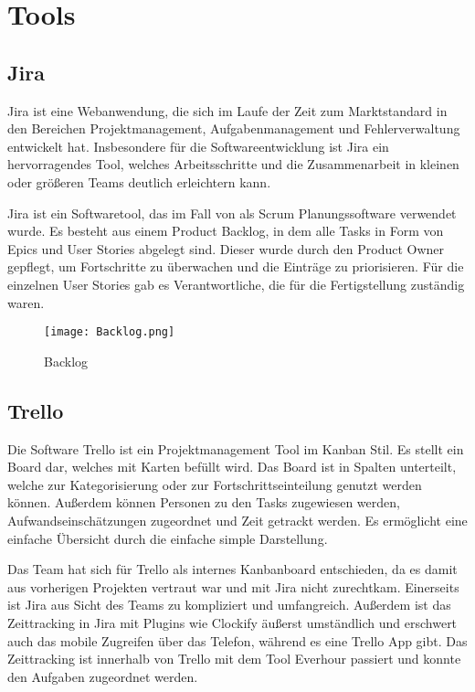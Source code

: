 
%


\section{Tools}\label{sec:tools}

\renewcommand{\kapitelautor}{Autor: Nils Hubmann}

\subsection{Jira}\label{subsec:jira}
%

\begin{coolQuote}
Jira ist eine Webanwendung, die sich im Laufe der Zeit zum Marktstandard in den Bereichen Projektmanagement, Aufgabenmanagement und Fehlerverwaltung entwickelt hat.
Insbesondere für die Softwareentwicklung ist Jira ein hervorragendes Tool, welches Arbeitsschritte und die Zusammenarbeit in kleinen oder größeren Teams deutlich erleichtern kann.
\end{coolQuote}

Jira ist ein Softwaretool, das im Fall von \ff als Scrum Planungssoftware verwendet wurde.
Es besteht aus einem Product Backlog, in dem alle Tasks in Form von Epics und User Stories abgelegt sind.
Dieser wurde durch den Product Owner gepflegt, um Fortschritte zu überwachen und die Einträge zu priorisieren.
Für die einzelnen User Stories gab es Verantwortliche, die für die Fertigstellung zuständig waren.

\begin{figure}[H]
    \texttt{[image: Backlog.png]}
    \caption{Backlog}
\end{figure}

\subsection{Trello}\label{subsec:Trello}
%
Die Software Trello ist ein Projektmanagement Tool im Kanban Stil.
Es stellt ein Board dar, welches mit Karten befüllt wird.
Das Board ist in Spalten unterteilt, welche zur Kategorisierung oder zur Fortschrittseinteilung genutzt werden können.
Außerdem können Personen zu den Tasks zugewiesen werden, Aufwandseinschätzungen zugeordnet und Zeit getrackt werden.
Es ermöglicht eine einfache Übersicht durch die einfache simple Darstellung.

Das Team hat sich für Trello als internes Kanbanboard entschieden, da es damit aus vorherigen Projekten vertraut war und mit Jira nicht zurechtkam.
Einerseits ist Jira aus Sicht des Teams zu kompliziert und umfangreich.
Außerdem ist das Zeittracking in Jira mit Plugins wie Clockify äußerst umständlich und erschwert auch das mobile Zugreifen über das Telefon, während es eine Trello App gibt.
Das Zeittracking ist innerhalb von Trello mit dem Tool Everhour passiert und konnte den Aufgaben zugeordnet werden.

